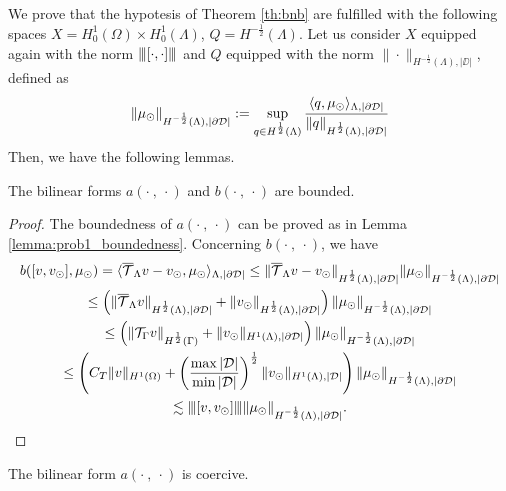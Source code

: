 We prove that the hypotesis of  Theorem \ref{th:bnb} are fulfilled with the following spaces $X=H^1_0(\Omega) \times H^1_0(\Lambda)$, $Q=H^{-\frac 12}(\Lambda)$.
Let us consider $X$ equipped again with the norm ${\left\vert\kern-0.25ex\left\vert\kern-0.25ex\left\vert [\cdot,\cdot ] \right\vert\kern-0.25ex\right\vert\kern-0.25ex\right\vert}$ and  
$Q$ equipped with the norm $\|\cdot \|_{H^{-\frac 12}(\Lambda),|\DD|}$, defined as
\begin{equation*}
\|\mu_{\odot} \|_{H^{-\frac 12}(\Lambda),|\partial\mathcal{D}|}:= \sup_{q\in H^{\frac 12}(\Lambda)}\frac{\langle q, \mu_{\odot}\rangle_{\Lambda, |\partial\mathcal{D}|}}{\|q\|_{H^{\frac 12}(\Lambda),|\partial\mathcal{D}|}}
\end{equation*}
Then, we have the following lemmas.
\begin{lemma}
The bilinear forms $a(\cdot \ , \ \cdot)$ and $b(\cdot \ , \ \cdot)$ are bounded.
\end{lemma}
\begin{proof}
The boundedness of $a(\cdot \ , \ \cdot)$ can be proved as in Lemma \ref{lemma:prob1_boundedness}. Concerning $b(\cdot \ , \ \cdot)$, we have
\begin{multline*}
b([v, v_{\odot}], \mu_{\odot})=  \langle  {\overline{\mathcal{T}}_\Lambda} v - v_{\odot}, \mu_{\odot} \rangle_{\Lambda, |\partial\mathcal{D}|} 
\leq \|{\overline{\mathcal{T}}_\Lambda} v - v_{\odot}\|_{H^{\frac 12 }(\Lambda), |\partial\mathcal{D}|}\|\mu_{\odot}\|_{H^{-\frac 12}(\Lambda),|\partial\mathcal{D}|}\\
\leq \left(\|{\overline{\mathcal{T}}_\Lambda} v\|_{H^{\frac 12 }(\Lambda), |\partial\mathcal{D}|}+\|v_{\odot}\|_{H^{\frac 12 }(\Lambda), |\partial\mathcal{D}|}\right)\|\mu_{\odot}\|_{H^{-\frac 12}(\Lambda),|\partial\mathcal{D}|} \\
\leq \left(\|{\mathcal{T}_\Gamma} v\|_{H^{\frac 12 }(\Gamma)}+ \|v_{\odot}\|_{H^1(\Lambda), |\partial\mathcal{D}|}\right)\|\mu_{\odot}\|_{H^{-\frac 12}(\Lambda),|\partial\mathcal{D}|} \\
\leq \left(C_T\|v\|_{H^1(\Omega)}+ \left(\frac{\max |\mathcal{D}|}{\min |\mathcal{D}|}\right)^{\frac 12} \|v_{\odot}\|_{H^1(\Lambda), |\mathcal{D}|}\right) \|\mu_{\odot}\|_{H^{-\frac 12}(\Lambda),|\partial\mathcal{D}|} \\
\lesssim {\left\vert\kern-0.25ex\left\vert\kern-0.25ex\left\vert [v,v_{\odot}] \right\vert\kern-0.25ex\right\vert\kern-0.25ex\right\vert}\|\mu_{\odot}\|_{H^{-\frac 12}(\Lambda),|\partial\mathcal{D}|}.
\end{multline*} 
\end{proof}

\begin{lemma}\label{lemma:prob2_coercivity}
The bilinear form $a(\cdot \ , \ \cdot)$ is coercive.
\end{lemma}

